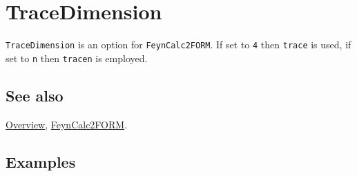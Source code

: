 \documentclass[../FeynCalcManual.tex]{subfiles}
\begin{document}
\hypertarget{tracedimension}{
\section{TraceDimension}\label{tracedimension}}

\texttt{TraceDimension} is an option for \texttt{FeynCalc2FORM}. If set
to \texttt{4} then \texttt{trace} is used, if set to \texttt{n} then
\texttt{tracen} is employed.

\subsection{See also}

\hyperlink{toc}{Overview}, \hyperlink{feyncalc2form}{FeynCalc2FORM}.

\subsection{Examples}
\end{document}
